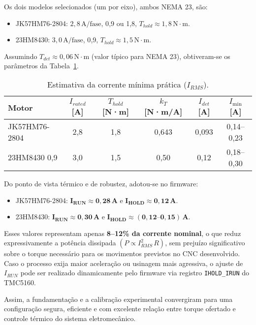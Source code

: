 Os dois modelos selecionados (um por eixo), ambos NEMA 23, são:
\begin{itemize}
	\item JK57HM76-2804: \(2{,}8\,\mathrm{A/fase}\), 0{,}9\textdegree{} ou 1{,}8\textdegree{}, \(T_{hold}\approx 1{,}8\,\mathrm{N\cdot m}\).
	\item 23HM8430: \(3{,}0\,\mathrm{A/fase}\), 0{,}9\textdegree{}, \(T_{hold}\approx 1{,}5\,\mathrm{N\cdot m}\).
\end{itemize}

Assumindo \(T_{det} \approx 0{,}06\,\mathrm{N\cdot m}\) (valor típico para NEMA 23), obtiveram-se os parâmetros da Tabela~\ref{tab:selecaocorrente}.

\begin{table}[H]
	\centering
	\caption{Estimativa da corrente mínima prática (\(I_{RMS}\)).}
	\label{tab:selecaocorrente}
	\begin{tabular}{lccccc}
		\toprule
		Motor & \(I_{rated}\) [A] & \(T_{hold}\) [N·m] & \(k_T\) [N·m/A] & \(I_{det}\) [A] & \(I_{\text{min}}\) [A] \\
		\midrule
		JK57HM76-2804 & 2{,}8 & 1{,}8 & 0{,}643 & 0{,}093 & 0{,}14--0{,}23 \\
		23HM8430 0{,}9\textdegree{} & 3{,}0 & 1{,}5 & 0{,}50 & 0{,}12 & 0{,}18--0{,}30 \\
		\bottomrule
	\end{tabular}
\end{table}

Do ponto de vista térmico e de robustez, adotou-se no firmware:
\begin{itemize}
	\item JK57HM76-2804: \(\mathbf{I_{RUN} \approx 0{,}28\,A}\) e \(\mathbf{I_{HOLD} \approx 0{,}12\,A}\).
	\item 23HM8430: \(\mathbf{I_{RUN} \approx 0{,}30\,A}\) e \(\mathbf{I_{HOLD} \approx (0{,}12\text{--}0{,}15)\,A}\).
\end{itemize}

Esses valores representam apenas \textbf{8--12\% da corrente nominal}, o que reduz expressivamente a potência dissipada \((P \propto I_{RMS}^{2}\,R)\), sem prejuízo significativo sobre o torque necessário para os movimentos previstos no CNC desenvolvido. Caso o processo exija maior aceleração ou usinagem mais agressiva, o ajuste de \(I_{RUN}\) pode ser realizado dinamicamente pelo firmware via registro \texttt{IHOLD\_IRUN} do TMC5160.

Assim, a fundamentação e a calibração experimental convergiram para uma configuração segura, eficiente e com excelente relação entre torque ofertado e controle térmico do sistema eletromecânico.
